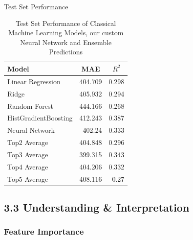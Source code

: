 \documentclass[ngerman,inputenc]{beamer}
\begin{document}
\begin{frame}{Test Set Performance}
  \begin{table}[h]
    \centering
    \begin{tabular}{lrr}
      \hline
      Model                & \multicolumn{1}{c}{MAE} & \multicolumn{1}{c}{$R^2$} \\ \hline
      Linear Regression    & 404.709                 & 0.298                     \\
      Ridge                & 405.932                 & 0.294                     \\
      Random Forest        & 444.166                 & 0.268                     \\
      HistGradientBoosting & 412.243                 & 0.387                     \\
      Neural Network       & 402.24                  & 0.333                     \\
      Top2 Average         & 404.848                 & 0.296                     \\
      Top3 Average         & 399.315                 & 0.343                     \\
      Top4 Average         & 404.206                 & 0.332                     \\
      Top5 Average         & 408.116                 & 0.27                      \\ \hline
    \end{tabular}
    \caption{Test Set Performance of Classical Machine Learning Models, our custom Neural Network and Ensemble Predictions}
    \label{tab:test-set}
  \end{table}
\end{frame}

\subsection{3.3 Understanding \& Interpretation}

\subsubsection{Feature Importance}
\end{document}
